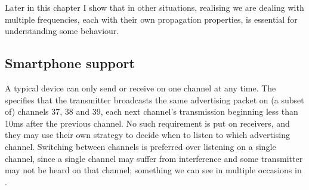 Later in this chapter I show that in other situations, realising we are dealing with multiple frequencies, each with their own propagation properties, is essential for understanding some behaviour.

\subsection{Smartphone support}
\label{sec:rss-smartphone}
A typical device can only send or receive on one channel at any time.
The \BTspec \citep{bluetooth40spec} specifies that the transmitter broadcasts the same advertising packet on (a subset of) channels 37, 38 and 39, each next channel's transmission beginning less than 10ms after the previous channel. 
No such requirement is put on receivers, and they may use their own strategy to decide when to listen to which advertising channel.
Switching between channels is preferred over listening on a single channel, since a single channel may suffer from interference and some transmitter may not be heard on that channel; something we can see in multiple occasions in .

